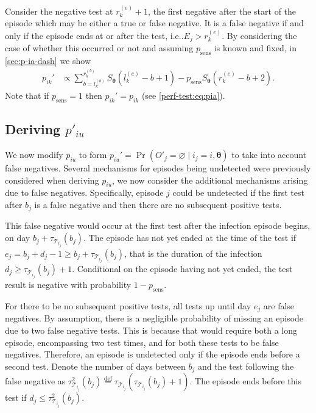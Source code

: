 \documentclass[12pt]{article}
\makeatletter
\DeclareMathOperator{\prob}{\mathrm{Pr}}
\renewcommand{\vec}[1]{\bm{#1}}
\newcommand{\psens}{p_\text{sens}}
\newcommand{\sched}{\mathcal{T}}
\DeclareRobustCommand\onedot{\futurelet\@let@token\@onedot}
\def\@onedot{\ifx\@let@token.\else.\null\fi\xspace}
\def\ie{i.e\onedot} \def\Ie{{I.e}\onedot}
\makeatother
\begin{document}
Consider the negative test at $r_k^{(e)}+1$, the first negative after the start of the episode which may be either a true or false negative.
It is a false negative if and only if the episode ends at or after the test, \ie $E_j > r_k^{(e)}$.
By considering the case of whether this occurred or not and assuming $\psens$ is known and fixed, in \cref{sec:p-ia-dash} we show
\begin{align}
p_{ik}'
&\propto \sum_{b = l_k^{(b)}}^{r_k^{(b)}} S_{\vec{\theta}}(l_k^{(e)} - b + 1) - p_\text{sens} S_{\vec{\theta}}(r_k^{(e)} - b + 2).
\label{imperf-test:eq:pia-prime-constant}
\end{align}
Note that if $p_\text{sens} = 1$ then $p_{ik}' = p_{ik}$ (see \cref{perf-test:eq:pia}).

\subsection{Deriving $p'_{iu}$} \label{imperf-test:sec:modifying-p_iu}

We now modify $p_{iu}$ to form $p_{iu}' = \prob(O'_j = \varnothing \mid i_j = i, \vec{\theta})$ to take into account false negatives.
Several mechanisms for episodes being undetected were previously considered when deriving $p_{iu}$, we now consider the additional mechanisms arising due to false negatives.
Specifically, episode $j$ could be undetected if the first test after $b_j$ is a false negative and then there are no subsequent positive tests.

This false negative would occur at the first test after the infection episode begins, on day $b_j + \tau_{\sched_{i_j}}(b_j)$.
The episode has not yet ended at the time of the test if $e_j = b_j + d_j - 1 \geq b_j + \tau_{\sched_{i_j}}(b_j)$, that is the duration of the infection $d_j \geq \tau_{\sched_{i_j}}(b_j) + 1$.
Conditional on the episode having not yet ended, the test result is negative with probability $1 - \psens$.

For there to be no subsequent positive tests, all tests up until day $e_j$ are false negatives.
By assumption, there is a negligible probability of missing an episode due to two false negative tests.
This is because that would require both a long episode, encompassing two test times, and for both these tests to be false negatives.
Therefore, an episode is undetected only if the episode ends before a second test.
Denote the number of days between $b_j$ and the test following the false negative as $\tau^2_{\sched_{i_j}}(b_j) \stackrel{\text{def}}{=} \tau_{\sched_{i_j}}(\tau_{\sched_{i_j}}(b_j) + 1)$.
The episode ends before this test if $d_j \leq \tau^2_{\sched_{i_j}}(b_j)$.
\end{document}

